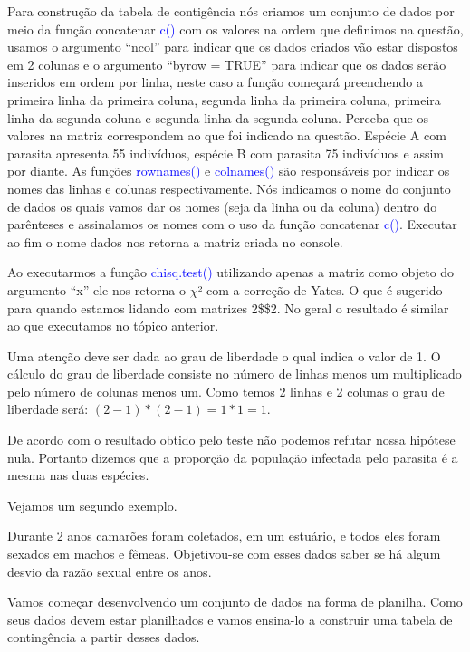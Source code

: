 \documentclass[14pt,titlepage, oneside, openany, a4paper]{book}
\begin{document}
Para construção da tabela de contigência nós criamos um conjunto de dados por meio da função concatenar \textcolor{blue}{c()} com os valores na ordem que definimos na questão, usamos o argumento ``ncol'' para indicar que os dados criados vão estar dispostos em 2 colunas e o argumento ``byrow = TRUE'' para indicar que os dados serão inseridos em ordem por linha, neste caso a função começará preenchendo a primeira linha da primeira coluna, segunda linha da primeira coluna, primeira linha da segunda coluna e segunda linha da segunda coluna. Perceba que os valores na matriz correspondem ao que foi indicado na questão. Espécie A com parasita apresenta 55 indivíduos, espécie B com parasita 75 indivíduos e assim por diante. As funções \textcolor{blue}{rownames()} e \textcolor{blue}{colnames()} são responsáveis por indicar os nomes das linhas e colunas respectivamente. Nós indicamos o nome do conjunto de dados os quais vamos dar os nomes (seja da linha ou da coluna) dentro do parênteses e assinalamos os nomes com o uso da função concatenar \textcolor{blue}{c()}. Executar ao fim o nome dados nos retorna a matriz criada no console.

Ao executarmos a função \textcolor{blue}{chisq.test()} utilizando apenas a matriz como objeto do argumento ``x'' ele nos retorna o \(\chi\)² com a correção de Yates. O que é sugerido para quando estamos lidando com matrizes 2\$\times\$2. No geral o resultado é similar ao que executamos no tópico anterior.

Uma atenção deve ser dada ao grau de liberdade o qual indica o valor de 1. O cálculo do grau de liberdade consiste no número de linhas menos um multiplicado pelo número de colunas menos um. Como temos 2 linhas e 2 colunas o grau de liberdade será: \((2-1)*(2-1) = 1*1 = 1\).

De acordo com o resultado obtido pelo teste não podemos refutar nossa hipótese nula. Portanto dizemos que a proporção da população infectada pelo parasita é a mesma nas duas espécies.

Vejamos um segundo exemplo.

Durante 2 anos camarões foram coletados, em um estuário, e todos eles foram sexados em machos e fêmeas. Objetivou-se com esses dados saber se há algum desvio da razão sexual entre os anos.

Vamos começar desenvolvendo um conjunto de dados na forma de planilha. Como seus dados devem estar planilhados e vamos ensina-lo a construir uma tabela de contingência a partir desses dados.
\end{document}
